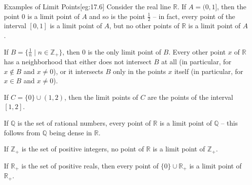 \begin{egBox}{Examples of Limit Points}[eg:17.6]
    Consider the real line \( \mathbb{R} \).
    If \( A = ( 0, 1 ] \), then the point \( 0 \) is a limit point of \( A \)
    and so is the point \( \frac{ 1 }{ 2 } \) -- in fact, every point of the 
    interval \( [ 0, 1 ] \) is a limit point of \( A \), but no other points of \( \mathbb{R} \) is a limit point of \( A \).

    \baseRule

    If \( B = \{ \frac{ 1 }{ n } \mid n \in \mathbb{Z}_{ + } \} \), then 
    \( 0 \) is the only limit point of \( B \).
    Every other point \( x \) of \( \mathbb{R} \) has a neighborhood that either
    does not intersect \( B \) at all (in particular, for \( x \notin B \) and 
    \( x \neq 0 \)), or it intersects \( B \) only in the points \( x \) itself
    (in particular, for \( x \in B \) and \( x \neq 0 \)).

    \baseRule

    If \( C = \{ 0 \} \cup ( 1, 2 ) \), then the limit points of \( C \) are the
    points of the interval \( [ 1, 2 ] \).

    \baseRule

    If \( \mathbb{Q} \) is the set of rational numbers, every point of 
    \( \mathbb{R} \) is a limit point of \( \mathbb{Q} \) -- this follows from 
    \( \mathbb{Q} \) being dense in \( \mathbb{R} \).

    \baseRule

    If \( \mathbb{Z}_{ + } \) is the set of positive integers, no point of
    \( \mathbb{R} \) is a limit point of \( \mathbb{Z}_{ + } \).

    \baseRule

    If \( \mathbb{R}_{ + } \) is the set of positive reals, then every point of 
    \( \{ 0 \} \cup \mathbb{R}_{ + } \) is a limit point of 
    \( \mathbb{R}_{ + } \).
\end{egBox}

